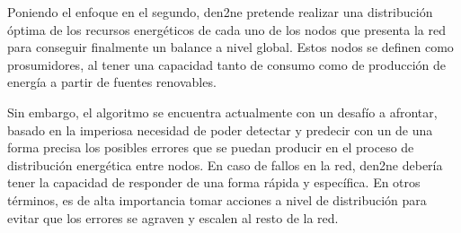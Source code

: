 Poniendo el enfoque en el segundo, \gls{den2ne} pretende realizar una distribución óptima de los recursos energéticos de cada uno de los nodos que presenta la red para conseguir finalmente un balance a nivel global. Estos nodos se definen como prosumidores, al tener una capacidad tanto de consumo como de producción de energía a partir de fuentes renovables. 

\vspace{3mm}

Sin embargo, el algoritmo se encuentra actualmente con un desafío a afrontar, basado en la imperiosa necesidad de poder detectar y predecir con un de una forma precisa los posibles errores que se puedan producir en el proceso de distribución energética entre nodos. En caso de fallos en la red, \gls{den2ne} debería tener la capacidad de responder de una forma rápida y específica. En otros términos, es de alta importancia tomar acciones a nivel de distribución para evitar que los errores se agraven y escalen al resto de la red.

\vspace{3mm}








